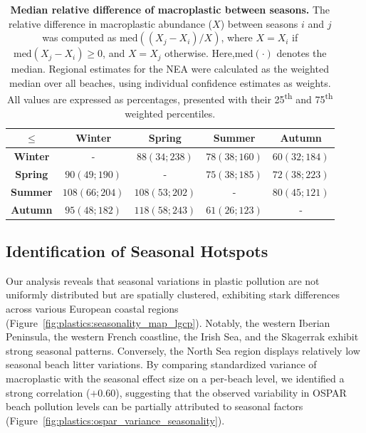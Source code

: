 \begin{table}[t]
    \centering
    \caption[Median relative difference of macroplastic between seasons.]{\textbf{Median relative difference of macroplastic between seasons.} The relative difference in macroplastic abundance (\(X\)) between seasons $i$ and $j$ was computed as $\mathrm{med}\left((X_j - X_i)/X\right)$, where $X = X_i$ if $\mathrm{med}(X_j - X_i) \geq 0$, and $X = X_j$ otherwise. Here,$\mathrm{med}(\cdot)$ denotes the median. Regional estimates for the NEA were calculated as the weighted median over all beaches, using individual confidence estimates as weights. All values are expressed as percentages, presented with their 25\textsuperscript{th} and 75\textsuperscript{th} weighted percentiles.}
    \label{tab:seasonal_effect_size_ci}
    \begin{tabular}{c|cccc}
        $\leq$ & \textbf{Winter}  & \textbf{Spring} & \textbf{Summer} & \textbf{Autumn} \\
        \midrule
        \textbf{Winter} & - & $88(34;238)$ & $78(38;160)$  & $60(32;184)$ \\
        \textbf{Spring} & $90(49;190)$ & - & $75(38;185)$ & $72(38;223)$ \\
        \textbf{Summer} & $108(66;204)$ & $108(53;202)$ & - & $80(45;121)$ \\
        \textbf{Autumn} & $95(48;182)$ & $118(58;243)$ & $61(26;123)$ & - \\
    \end{tabular}
\end{table}
\subsection{Identification of Seasonal Hotspots}

Our analysis reveals that seasonal variations in plastic pollution are not uniformly distributed but are spatially clustered, exhibiting stark differences across various European coastal regions (Figure~\ref{fig:plastics:seasonality_map_lgcp}). Notably, the western Iberian Peninsula, the western French coastline, the Irish Sea, and the Skagerrak exhibit strong seasonal patterns. Conversely, the North Sea region displays relatively low seasonal beach litter variations. By comparing standardized variance of macroplastic with the seasonal effect size on a per-beach level, we identified a strong correlation ($+0.60$), suggesting that the observed variability in OSPAR beach pollution levels can be partially attributed to seasonal factors (Figure~\ref{fig:plastics:ospar_variance_seasonality}). 






